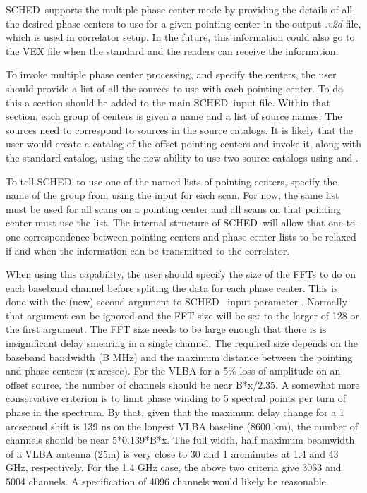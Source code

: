 \documentclass{report}
\newcommand{\schedb}{{\sc SCHED~}}
\begin{document}
\schedb supports the multiple phase center mode by providing the
details of all the desired phase centers to use for a given pointing
center in the output {\sl .v2d} file, which is used in correlator
setup.  In the future, this information could also go to the VEX file
when the standard and the readers can receive the information.

To invoke multiple phase center processing, and specify the centers,
the user should provide a list of all the sources to use with each
pointing center.  To do this a 
section should be added to the main \schedb input file.  Within that
section, each group of centers is given a name and a list of source
names.  The sources need to correspond to sources in the source
catalogs.  It is likely that the user would create a catalog of the
offset pointing centers and invoke it, along with the standard
catalog, using the new ability to use two source catalogs using
 and .

To tell \schedb to use one of the named lists of pointing centers,
specify the name of the group from  using the input  for each scan.  For now, the same list must be
used for all scans on a pointing center and all scans on that pointing
center must use the list.  The internal structure of \schedb will
allow that one-to-one correspondence between pointing centers and
phase center lists to be relaxed if and when the information can
be transmitted to the correlator.

When using this capability, the user should specify the size of the
FFTs to do on each baseband channel before spliting the data for each
phase center.  This is done with the (new) second argument to \schedb
input parameter .  Normally that
argument can be ignored and the FFT size will be set to the larger of
128 or the first argument.  The FFT size needs to be large enough that
there is is insignificant delay smearing in a single channel.  The
required size depends on the baseband bandwidth (B MHz) and the
maximum distance between the pointing and phase centers (x arcsec).
For the VLBA for a 5\% loss of amplitude on an offset source, the
number of channels should be near B*x/2.35.  A somewhat more
conservative criterion is to limit phase winding to 5 spectral points
per turn of phase in the spectrum.  By that, given that the maximum delay
change for a 1 arcsecond shift is 139 ns on the longest VLBA baseline
(8600 km), the number of channels should be near 5*0.139*B*x.  The
full width, half maximum beamwidth of a VLBA antenna (25m) is very
close to 30 and 1 arcminutes at 1.4 and 43 GHz, respectively.  For the
1.4 GHz case, the above two criteria give 3063 and 5004 channels.  A
specification of 4096 channels would likely be reasonable.
\end{document}
